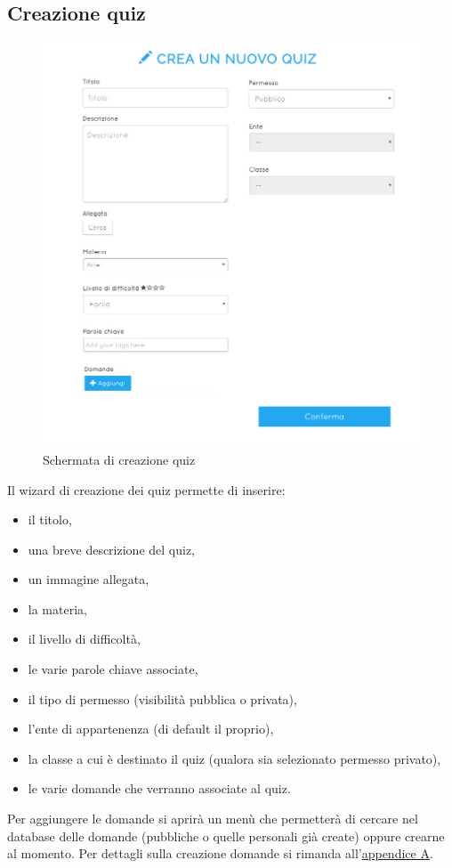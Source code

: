 \documentclass[a4paper, titlepage]{article}
\begin{document}
	 \newpage
	 \subsection{Creazione quiz}
	 \begin{figure}[!h]
	 	\centering
	 	\includegraphics[scale=0.33]{Img/screen_CreazioneQuiz.png}
	 	\caption{Schermata di creazione quiz}
	 \end{figure}
	 Il wizard di creazione dei quiz permette di inserire:
	 \begin{itemize}
	 	\item il titolo,
	 	\item una breve descrizione del quiz,
	 	\item un immagine allegata,
	 	\item la materia,
	 	\item il livello di difficoltà,
	 	\item le varie parole chiave associate,
	 	\item il tipo di permesso (visibilità pubblica o privata),
	 	\item l'ente di appartenenza (di default il proprio),
	 	\item la classe a cui è destinato il quiz (qualora sia selezionato permesso privato),
	 	\item le varie domande che verranno associate al quiz.
	 \end{itemize}
	 Per aggiungere le domande si aprirà un menù che permetterà di cercare nel database delle domande (pubbliche o quelle personali già create) oppure crearne al momento. Per dettagli sulla creazione domande si rimanda all'\hyperref[domande]{appendice A}.
	 
\end{document}
